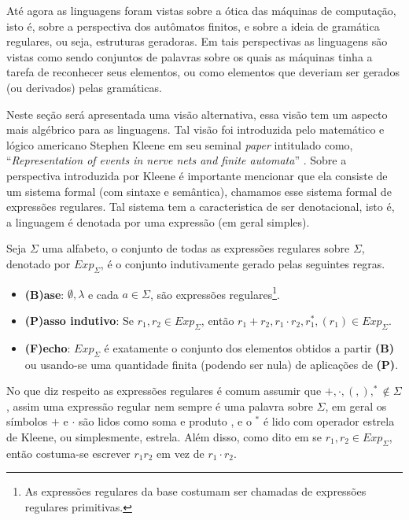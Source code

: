 Até agora as linguagens foram vistas sobre a ótica das máquinas de computação, isto é, sobre a perspectiva dos autômatos finitos, e sobre a ideia de gramática regulares, ou seja, estruturas geradoras. Em tais perspectivas as linguagens são vistas como sendo conjuntos de palavras sobre os quais as máquinas tinha a tarefa de reconhecer seus elementos, ou como elementos que deveriam ser gerados (ou derivados) pelas gramáticas. 

Neste seção será apresentada uma visão alternativa, essa visão tem um aspecto mais algébrico para as linguagens. Tal visão foi introduzida pelo matemático e lógico americano Stephen Kleene em seu seminal \textit{paper} intitulado como, ``\textit{Representation of events in nerve nets and finite automata}'' \cite{kleene1951}. Sobre a perspectiva introduzida por Kleene é importante mencionar que ela consiste de um sistema formal (com sintaxe e semântica), chamamos esse sistema formal de expressões  regulares. Tal sistema tem a caracteristica de ser denotacional, isto é, a linguagem é denotada por uma expressão (em geral simples).

\begin{definicao}\label{def:ExpRegularesSintaxe}
	Seja $\Sigma$ uma alfabeto, o conjunto de todas as expressões regulares sobre $\Sigma$, denotado por $Exp_\Sigma$, é o conjunto indutivamente gerado pelas seguintes regras.
	\begin{itemize}
		\item[ ]\textbf{(B)ase}: $\emptyset, \lambda$ e cada $a \in \Sigma$, são expressões regulares\footnote{As expressões regulares da base costumam ser chamadas de expressões regulares primitivas.}.
		\item[ ]\textbf{(P)asso indutivo}:  Se $r_1, r_2 \in Exp_\Sigma$, então $r_1 + r_2, r_1 \cdot r_2, r_1^*, (r_1) \in Exp_\Sigma$.
		\item[ ]\textbf{(F)echo}: $Exp_\Sigma$ é exatamente o conjunto dos elementos obtidos a partir \textbf{(B)} ou usando-se uma quantidade finita (podendo ser nula) de aplicações de \textbf{(P)}.
	\end{itemize}
\end{definicao}

No que diz respeito as expressões regulares é comum assumir que $+, \cdot, (, ), ^* \notin \Sigma$, assim uma expressão regular nem sempre é uma palavra sobre $\Sigma$, em geral os símbolos $+$ e $\cdot$ são lidos como soma e produto \cite{carroll1989}, e o $^*$ é lido com operador estrela de Kleene, ou simplesmente, estrela. Além disso, como dito em \cite{benjaLivro2010} se $r_1, r_2 \in Exp_\Sigma$, então costuma-se escrever $r_1r_2$ em vez de $r_1 \cdot r_2$.

